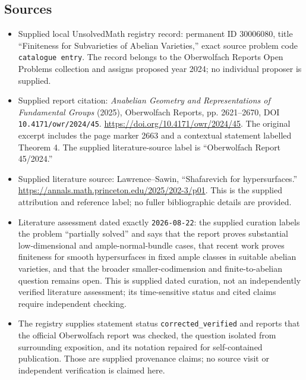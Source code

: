 \documentclass[11pt]{article}
\begin{document}
\subsection{Sources}
\begin{itemize}
\item Supplied local UnsolvedMath registry record: permanent ID \(30006080\), title ``Finiteness for Subvarieties of Abelian Varieties,'' exact source problem code \texttt{catalogue entry}. The record belongs to the Oberwolfach Reports Open Problems collection and assigns proposed year 2024; no individual proposer is supplied.
\item Supplied report citation: \emph{Anabelian Geometry and Representations of Fundamental Groups} (2025), Oberwolfach Reports, pp. 2621--2670, DOI \texttt{10.4171/owr/2024/45}. \url{https://doi.org/10.4171/owr/2024/45}. The original excerpt includes the page marker 2663 and a contextual statement labelled Theorem 4. The supplied literature-source label is ``Oberwolfach Report 45/2024.''
\item Supplied literature source: Lawrence--Sawin, ``Shafarevich for hypersurfaces.'' \url{https://annals.math.princeton.edu/2025/202-3/p01}. This is the supplied attribution and reference label; no fuller bibliographic details are provided.
\item Literature assessment dated exactly \texttt{2026-08-22}: the supplied curation labels the problem ``partially solved'' and says that the report proves substantial low-dimensional and ample-normal-bundle cases, that recent work proves finiteness for smooth hypersurfaces in fixed ample classes in suitable abelian varieties, and that the broader smaller-codimension and finite-to-abelian question remains open. This is supplied dated curation, not an independently verified literature assessment; its time-sensitive status and cited claims require independent checking.
\item The registry supplies statement status \texttt{corrected\_verified} and reports that the official Oberwolfach report was checked, the question isolated from surrounding exposition, and its notation repaired for self-contained publication. Those are supplied provenance claims; no source visit or independent verification is claimed here.
\end{itemize}
\end{document}
